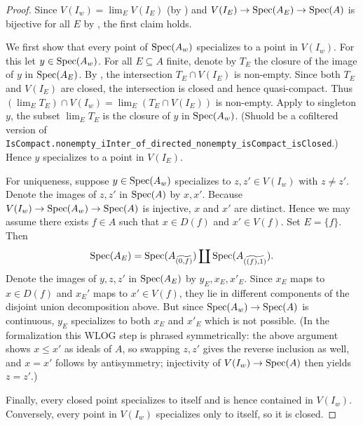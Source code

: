 \begin{proof}
    \leanok
    Since $V(I_w) = \lim_{E} V(I_E)$ (by ) and $V(I_E) \to \mathrm{Spec}(A_E) \to \mathrm{Spec}(A)$ is
    bijective for all $E$ by , the
    first claim holds.

    We first show that every point of $\mathrm{Spec}(A_w)$ specializes to a point in $V(I_w)$.
    For this let $y \in \mathrm{Spec}(A_w)$. For all $E \subseteq A$ finite, denote by
    $T_E$ the closure of the image of $y$ in $\mathrm{Spec}(A_E)$. By
    , the intersection $T_E \cap V(I_E)$ is
    non-empty. Since both $T_E$ and $V(I_E)$ are closed, the intersection is closed
    and hence quasi-compact. Thus $(\lim_E T_E) \cap V(I_w) = \lim_E (T_E \cap V(I_E))$ is non-empty.
    Apply  to singleton \({y}\), the subset $\lim_E T_E$ is the closure of $y$ in $\mathrm{Spec}(A_w)$. (Shuold be a cofiltered version of \verb`IsCompact.nonempty_iInter_of_directed_nonempty_isCompact_isClosed`.) Hence
    $y$ specializes to a point in $V(I_E)$.

    For uniqueness, suppose $y \in \mathrm{Spec}(A_w)$ specializes to $z, z' \in V(I_w)$ with
    $z \neq z'$. Denote the images of $z, z'$ in $\mathrm{Spec}(A)$ by $x, x'$.
    Because $V(I_w) \to \mathrm{Spec}(A_w) \to \mathrm{Spec}(A)$ is injective, $x$ and $x'$ are distinct. Hence we may
    assume there exists $f \in A$ such that $x \in D(f)$ and $x' \in V(f)$. Set
    $E = \{f\}$. Then
    \[
        \mathrm{Spec}(A_E) = \mathrm{Spec}(A_{\widetilde{(0, f)}}) \coprod \mathrm{Spec}(A_{\widetilde{((f), 1)}})
    .\]
    Denote the images of $y, z, z'$ in $\mathrm{Spec}(A_E)$ by $y_E, x_E, x'_E$. Since
    $x_E$ maps to $x \in D(f)$ and $x_E'$ maps to $x' \in V(f)$, they lie
    in different components of the disjoint union decomposition above. But
    since $\mathrm{Spec}(A_w) \to \mathrm{Spec}(A)$ is continuous, $y_E$ specializes to both $x_E$ and $x'_E$
    which is not possible.
    (In the formalization this WLOG step is phrased symmetrically: the above argument shows
    $x \le x'$ as ideals of $A$, so swapping $z, z'$ gives the reverse inclusion as well, and
    $x = x'$ follows by antisymmetry; injectivity of $V(I_w) \to \mathrm{Spec}(A)$ then yields $z = z'$.)

    Finally, every closed point specializes to itself and is hence contained in $V(I_{w})$. Conversely,
    every point in $V(I_{w})$ specializes only to itself, so it is closed.
\end{proof}

